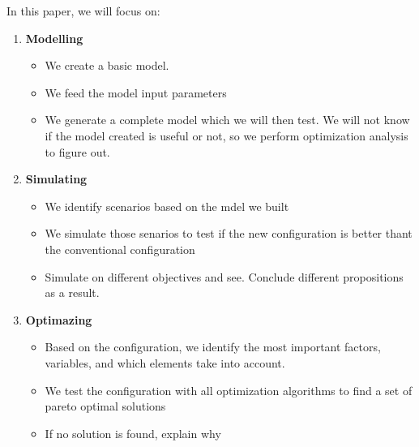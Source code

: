 \documentclass[12pt]{article}
\newcommand{\h}[1]{\colorbox{yellow}{#1}}
\begin{document}

In this paper, we will focus on: 

\begin{enumerate}
\item {\bf Modelling} 


\begin{itemize}
\item We create a basic model.  
\item We feed the model input parameters
\item We generate a complete model which we will then test. We will not know if the model created is useful or not, so we perform optimization analysis to figure out. 
\end{itemize}

\item {\bf Simulating} 


\begin{itemize}
\item We identify scenarios based on the mdel we built 
\item We simulate those senarios to test if the new configuration is better thant the conventional configuration
\item Simulate on different objectives and see. Conclude different propositions as a result.
\end{itemize}

\item {\bf Optimazing} 
\begin{itemize}
\item Based on the configuration, we identify the most important factors, variables, and which elements take into account. 
\item We test the configuration with all optimization algorithms to find a set of pareto optimal solutions
\item If no solution is found, explain why
\end{itemize}
\end{enumerate}
\end{document}
